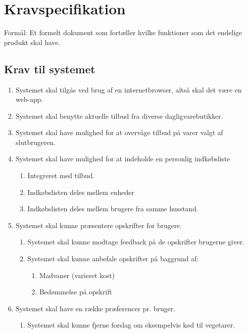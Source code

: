 \section{Kravspecifikation}
Formål: Et formelt dokument som fortæller hvilke funktioner som det endelige produkt skal have.

\subsection{Krav til systemet}
\begin{enumerate}
	\item Systemet skal tilgås ved brug af en internetbrowser, altså skal det være en web-app.
	\item Systemet skal benytte aktuelle tilbud fra diverse dagligvarebutikker.
	\item Systemet skal have mulighed for at overvåge tilbud på varer valgt af slutbrugeren.
	\item Systemet skal have mulighed for at indeholde en personlig indkøbsliste
	\begin{enumerate}
		\item Integreret med tilbud.
		\item Indkøbslisten deles mellem enheder
		\item Indkøbslisten deles mellem brugere fra samme husstand.
	\end{enumerate}
	\item Systemet skal kunne præsentere opskrifter for brugere.
	\begin{enumerate}
		\item Systemet skal kunne modtage feedback på de opskrifter brugerne giver.
		\item Systemet skal kunne anbefale opskrifter på baggrund af:
		\begin{enumerate}
			\item Madvaner (varieret kost)
			\item Bedømmelse på opskrift
		\end{enumerate}
	\end{enumerate}
	\item Systemet skal have en række præferencer pr. bruger.
	\begin{enumerate}
		\item Systemet skal kunne fjerne forslag om eksempelvis kød til vegetarer.
	\end{enumerate}
\end{enumerate}
